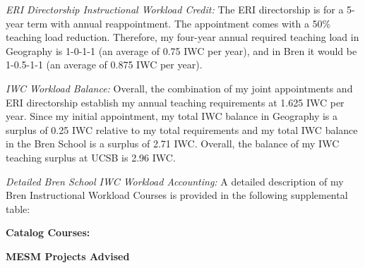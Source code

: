 \documentclass[10pt]{article}
\begin{document}
\begin{enumerate}
{\item {\em ERI Directorship Instructional Workload Credit:} The ERI directorship is for a 5-year term with annual reappointment.  The appointment comes with a 50\% teaching load reduction. Therefore, my four-year annual required teaching load in Geography is 1-0-1-1 (an average of 0.75 IWC per year), and in Bren it would be 1-0.5-1-1 (an average of 0.875 IWC per year). 

\item {\em IWC Workload Balance:} Overall, the combination of my joint appointments and ERI directorship establish my annual teaching requirements at 1.625 IWC per year. Since my initial appointment, my total IWC balance in Geography is a surplus of 0.25 IWC relative to my total requirements and my total IWC balance in the Bren School is a surplus of 2.71 IWC.  Overall, the balance of my IWC teaching surplus at UCSB is 2.96 IWC.


\item {\em Detailed Bren School IWC Workload Accounting:} A detailed description of my Bren Instructional Workload Courses is provided in the following supplemental table: 
\begin{centering}
\end{centering}
}

\end{enumerate}

\vspace{0.5cm}
{\bf Catalog Courses:}


\vspace{0.5cm}
{\bf MESM Projects Advised}

\end{document}
